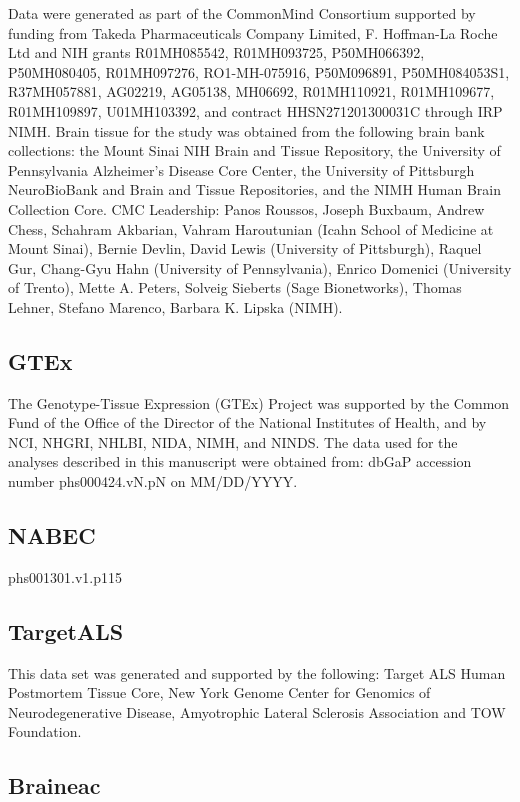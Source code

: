 Data were generated as part of the CommonMind Consortium supported by funding from Takeda Pharmaceuticals Company Limited, F. Hoffman-La Roche Ltd and NIH grants R01MH085542, R01MH093725, P50MH066392, P50MH080405, R01MH097276, RO1-MH-075916, P50M096891, P50MH084053S1, R37MH057881, AG02219, AG05138, MH06692, R01MH110921, R01MH109677, R01MH109897, U01MH103392, and contract HHSN271201300031C through IRP NIMH. Brain tissue for the study was obtained from the following brain bank collections: the Mount Sinai NIH Brain and Tissue Repository, the University of Pennsylvania Alzheimer’s Disease Core Center, the University of Pittsburgh NeuroBioBank and Brain and Tissue Repositories, and the NIMH Human Brain Collection Core. CMC Leadership: Panos Roussos, Joseph Buxbaum, Andrew Chess, Schahram Akbarian, Vahram Haroutunian (Icahn School of Medicine at Mount Sinai), Bernie Devlin, David Lewis (University of Pittsburgh), Raquel Gur, Chang-Gyu Hahn (University of Pennsylvania), Enrico Domenici (University of Trento), Mette A. Peters, Solveig Sieberts (Sage Bionetworks), Thomas Lehner, Stefano Marenco, Barbara K. Lipska (NIMH). 

\subsection{GTEx}

The Genotype-Tissue Expression (GTEx) Project was supported by the Common Fund of the Office of the Director of the National Institutes of Health, and by NCI, NHGRI, NHLBI, NIDA, NIMH, and NINDS. The data used for the analyses described in this manuscript were obtained from:  dbGaP accession number phs000424.vN.pN on MM/DD/YYYY. 

\subsection{NABEC}
phs001301.v1.p115 

\subsection{TargetALS}

This data set was generated and supported by the following: Target ALS Human Postmortem Tissue Core, New York Genome Center for Genomics of Neurodegenerative Disease, Amyotrophic Lateral Sclerosis Association and TOW Foundation. 

\subsection{Braineac}

